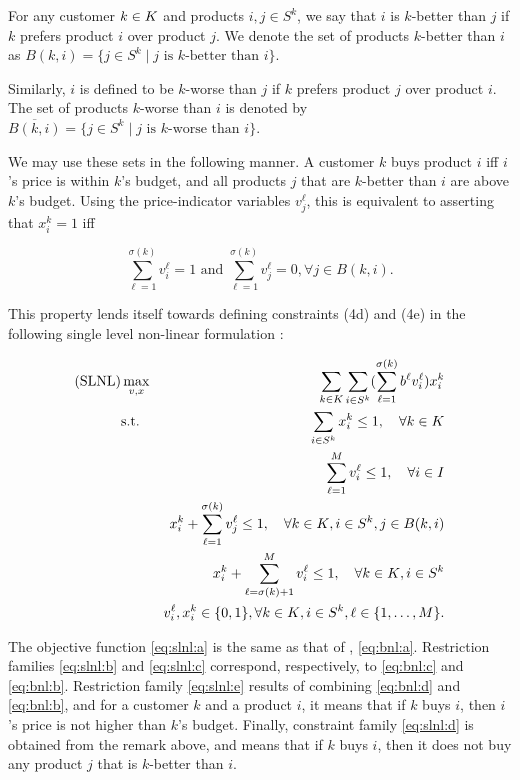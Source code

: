 \begin{definition}
    For any customer ${k \in K}$ and products $i,j\in S^k$, we say that $i$ is
    $k$-better than $j$ if $k$ prefers product $i$ over product $j$. We denote
    the set of products $k$-better than $i$ as
    $
        B(k,i) = \{j\in S^k \mid j\text{ is } k\text{-better than } i\}
    $.
    
    Similarly, $i$ is defined to be $k$-worse than $j$ if $k$ prefers product
    $j$ over product $i$. The set of products $k$-worse than $i$ is denoted by
    $
        \overline{B(k,i)} = \{j\in S^k \mid j\text{ is } k\text{-worse than } i\}
    $.
\end{definition}

We may use these sets in the following manner. A customer $k$ buys product $i$
iff $i$'s price is within $k$'s budget, and all products $j$ that are $k$-better
than $i$ are above $k$'s budget. Using the price-indicator variables $v_j^\ell$,
this is equivalent to asserting that $x_i^k=1$ iff

\[
    \sum_{\ell=1}^{\sigma(k)} v_i^\ell = 1 \text{ and }
        \sum_{\ell=1}^{\sigma(k)} v_j^\ell = 0, \forall j\in B(k, i).
\]

This property lends itself towards defining constraints (4d) and (4e) in the
following single level non-linear formulation \slnl:

\begin{eqnarray}
    \rm{(SLNL)}
    &\max_{v,x}  & \sum_{k \in K}\sum_{i\in S^k} (\sum_{\ell=1}^{\sigma(k)} b^\ell v_i^\ell)x_i^k \label{eq:slnl:a}\\
    &\text{s.t.} & \sum_{i\in S^k} x_i^k \leq 1, \quad\forall{\ensuremath{k \in K}}                            \label{eq:slnl:b}\\
    &            & \sum_{\ell=1}^M v_i^\ell \leq 1, \quad\forall{\ensuremath{i \in I}}                         \label{eq:slnl:c}\\
    &            & x_i^k + \sum_{\ell=1}^{\sigma(k)} v_j^\ell \leq 1, \quad \forall{\ensuremath{k \in K}}, i \in S^k, j\in B(k, i) \label{eq:slnl:d}\\
    &            & x_i^k + \sum_{\ell=\sigma(k)+1}^M v_i^\ell \leq 1, \quad \forall{\ensuremath{k \in K}}, i \in S^k               \label{eq:slnl:e}\\ 
    &            & v_i^\ell, x_i^k\in\{0,1\}, \forall{\ensuremath{k \in K}}, i\in S^k, \ell\in\{1, \ldots, M\}.                    \label{eq:slnl:f}
\end{eqnarray}

The objective function \eqref{eq:slnl:a} is the same as that of \bnl,
\eqref{eq:bnl:a}. Restriction families \eqref{eq:slnl:b} and \eqref{eq:slnl:c}
correspond, respectively, to \eqref{eq:bnl:c} and \eqref{eq:bnl:b}. Restriction
family \eqref{eq:slnl:e} results of combining \eqref{eq:bnl:d} and
\eqref{eq:bnl:b}, and for a customer $k$ and a product $i$, it means that if $k$
buys $i$, then $i$'s price is not higher than $k$'s budget. Finally, constraint
family \eqref{eq:slnl:d} is obtained from the remark above, and means that if
$k$ buys $i$, then it does not buy any product $j$ that is $k$-better than $i$.

